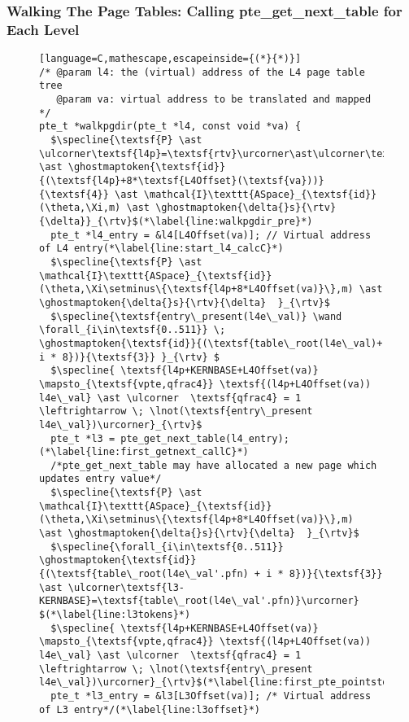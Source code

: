 \subsubsection{Walking The Page Tables: Calling \textsf{pte\_get\_next\_table} for Each Level}
\label{wlkpgdirC}
\begin{figure}\footnotesize
\ifPLDI
\begin{lstlisting}[language=C,mathescape,escapeinside={(*}{*)}]
/* @param l4: the (virtual) address of the L4 page table tree
   @param va: virtual address to be translated and mapped */
pte_t *walkpgdir(pte_t *l4, const void *va) {
  $\specline{\textsf{P} \ast \ulcorner\textsf{l4p}=\textsf{rtv}\urcorner\ast\ulcorner\textsf{rtv+KERNBASE}=\textsf{l4}\urcorner \ast \ghostmaptoken{\textsf{id}}{(\textsf{l4p}+8*\textsf{L4Offset}(\textsf{va}))}{\textsf{4}} \ast \mathcal{I}\texttt{ASpace}_{\textsf{id}}(\theta,\Xi,m) \ast \ghostmaptoken{\delta{}s}{\rtv}{\delta}}_{\rtv}$(*\label{line:walkpgdir_pre}*)
  pte_t *l4_entry = &l4[L4Offset(va)]; // Virtual address of L4 entry(*\label{line:start_l4_calcC}*)
  $\specline{\textsf{P} \ast \mathcal{I}\texttt{ASpace}_{\textsf{id}}(\theta,\Xi\setminus\{\textsf{l4p+8*L4Offset(va)}\},m) \ast \ghostmaptoken{\delta{}s}{\rtv}{\delta}  }_{\rtv}$
  $\specline{\textsf{entry\_present(l4e\_val)} \wand \forall_{i\in\textsf{0..511}} \; \ghostmaptoken{\textsf{id}}{(\textsf{table\_root(l4e\_val)+ i * 8})}{\textsf{3}} }_{\rtv} $
  $\specline{ \textsf{l4p+KERNBASE+L4Offset(va)} \mapsto_{\textsf{vpte,qfrac4}} \textsf{(l4p+L4Offset(va)) l4e\_val} \ast \ulcorner  \textsf{qfrac4} = 1 \leftrightarrow \; \lnot(\textsf{entry\_present l4e\_val})\urcorner}_{\rtv}$    
  pte_t *l3 = pte_get_next_table(l4_entry); (*\label{line:first_getnext_callC}*) 
  /*pte_get_next_table may have allocated a new page which updates entry value*/
  $\specline{\textsf{P} \ast \mathcal{I}\texttt{ASpace}_{\textsf{id}}(\theta,\Xi\setminus\{\textsf{l4p+8*L4Offset(va)}\},m)  \ast \ghostmaptoken{\delta{}s}{\rtv}{\delta}  }_{\rtv}$
  $\specline{\forall_{i\in\textsf{0..511}} \ghostmaptoken{\textsf{id}}{(\textsf{table\_root(l4e\_val'.pfn) + i * 8})}{\textsf{3}}  \ast \ulcorner\textsf{l3-KERNBASE}=\textsf{table\_root(l4e\_val'.pfn)}\urcorner} $(*\label{line:l3tokens}*)
  $\specline{ \textsf{l4p+KERNBASE+L4Offset(va)} \mapsto_{\textsf{vpte,qfrac4}} \textsf{(l4p+L4Offset(va)) l4e\_val} \ast \ulcorner  \textsf{qfrac4} = 1 \leftrightarrow \; \lnot(\textsf{entry\_present l4e\_val})\urcorner}_{\rtv}$(*\label{line:first_pte_pointstoC}*)
  pte_t *l3_entry = &l3[L3Offset(va)]; /* Virtual address of L3 entry*/(*\label{line:l3offset}*)

\end{lstlisting}
\end{figure}
